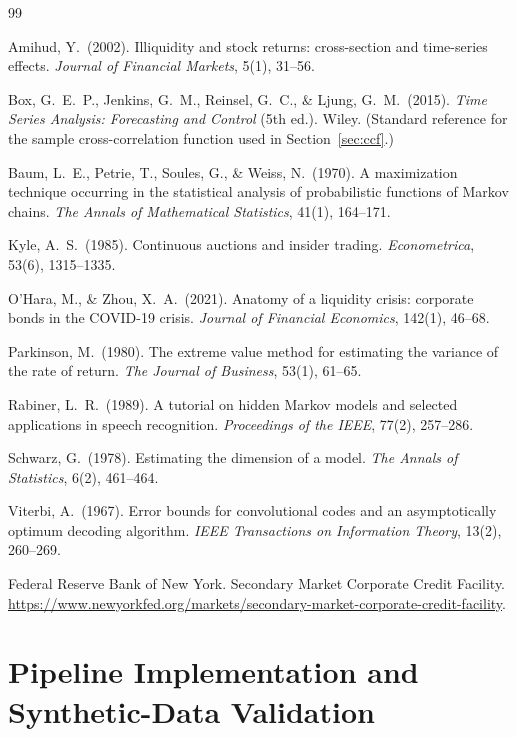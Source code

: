 \documentclass[11pt]{article}
\theoremstyle{definition}
\theoremstyle{remark}
\begin{document}
\begin{thebibliography}{99}

 Amihud, Y.\ (2002). Illiquidity and stock returns: cross-section and time-series effects. \emph{Journal of Financial Markets}, 5(1), 31--56.

 Box, G.\ E.\ P., Jenkins, G.\ M., Reinsel, G.\ C., \& Ljung, G.\ M.\ (2015). \emph{Time Series Analysis: Forecasting and Control} (5th ed.). Wiley. (Standard reference for the sample cross-correlation function used in Section~\ref{sec:ccf}.)

 Baum, L.\ E., Petrie, T., Soules, G., \& Weiss, N.\ (1970). A maximization technique occurring in the statistical analysis of probabilistic functions of Markov chains. \emph{The Annals of Mathematical Statistics}, 41(1), 164--171.

 Kyle, A.\ S.\ (1985). Continuous auctions and insider trading. \emph{Econometrica}, 53(6), 1315--1335.

 O'Hara, M., \& Zhou, X.\ A.\ (2021). Anatomy of a liquidity crisis: corporate bonds in the COVID-19 crisis. \emph{Journal of Financial Economics}, 142(1), 46--68.

 Parkinson, M.\ (1980). The extreme value method for estimating the variance of the rate of return. \emph{The Journal of Business}, 53(1), 61--65.

 Rabiner, L.\ R.\ (1989). A tutorial on hidden Markov models and selected applications in speech recognition. \emph{Proceedings of the IEEE}, 77(2), 257--286.

 Schwarz, G.\ (1978). Estimating the dimension of a model. \emph{The Annals of Statistics}, 6(2), 461--464.

 Viterbi, A.\ (1967). Error bounds for convolutional codes and an asymptotically optimum decoding algorithm. \emph{IEEE Transactions on Information Theory}, 13(2), 260--269.

 Federal Reserve Bank of New York. Secondary Market Corporate Credit Facility. \url{https://www.newyorkfed.org/markets/secondary-market-corporate-credit-facility}.

\end{thebibliography}

\appendix
\section{Pipeline Implementation and Synthetic-Data Validation}
\label{sec:appendix}
\end{document}
